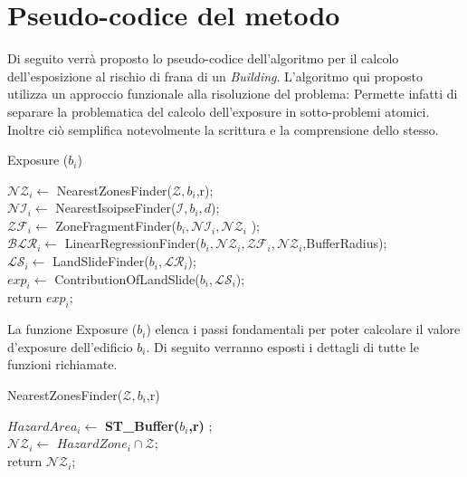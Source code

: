 
\chapter{Pseudo-codice del metodo} %

\label{ch:name} %
Di seguito verrà proposto lo pseudo-codice dell'algoritmo per il calcolo dell'esposizione al rischio di frana di un \textit{Building}. L'algoritmo qui proposto utilizza un approccio funzionale alla risoluzione del problema: Permette infatti di separare la problematica del calcolo dell'exposure in sotto-problemi atomici. Inoltre ciò semplifica notevolmente la scrittura e la comprensione dello stesso.



\begin{algorithm}[H]
	
	
	\IncMargin{1em}
	\caption{Exposure ($b_i$)}
	\label{alg:0}
	\BlankLine
	
	\SetAlgoNoLine
	$ \mathcal{NZ}_i \leftarrow$ NearestZonesFinder($\mathcal{Z},b_i$,r); \\
	$ \mathcal{NI}_i \leftarrow$ NearestIsoipseFinder($\mathcal{I},b_i,d$); \\
	$ \mathcal{ZF}_i \leftarrow$ ZoneFragmentFinder($b_i , \mathcal{NI}_i , \mathcal{NZ}_i $ );  \\
	$ \mathcal{BLR}_i \leftarrow $ LinearRegressionFinder($b_i,\mathcal{NZ}_i,\mathcal{ZF}_i,\mathcal{NZ}_i$,BufferRadius); \\
	$ \mathcal{LS}_i \leftarrow $ LandSlideFinder($b_i , \mathcal{LR}_i $); \\
	$ exp_i \leftarrow$ ContributionOfLandSlide($b_i , \mathcal{LS}_i $);\\
	return $ exp_i $;
	
	
\end{algorithm}
La funzione Exposure ($b_i$) elenca i passi fondamentali per poter calcolare il  valore d'exposure dell'edificio $b_i$. Di seguito verranno esposti i dettagli di tutte le funzioni richiamate.

\begin{algorithm}[H]
	
	\IncMargin{1em}
	\caption{NearestZonesFinder($\mathcal{Z},b_i$,r)}
	\label{alg:1}
	\BlankLine
	\SetAlgoNoLine
	$ HazardArea_i  \leftarrow $ \textbf{ST\_Buffer($b_i$,r)} ; \\ 
	$ \mathcal{NZ}_i  \leftarrow $ $HazardZone_i \cap \mathcal{Z}$; \\
	return $\mathcal{NZ}_i$;
	
\end{algorithm}

